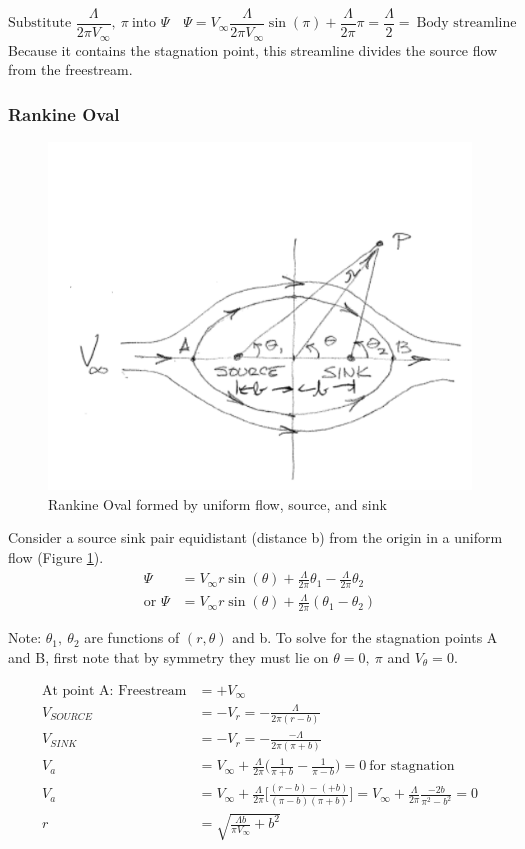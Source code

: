 \documentclass[draft=false, titlepage]{article}
\begin{document}
\begin{equation*}
\text{Substitute } \frac{\Lambda}{2\pi V_\infty},\ \pi\ \text{into } \Psi \quad
\Psi = V_\infty \frac{\Lambda}{2\pi V_\infty}\sin(\pi) + \frac{\Lambda}{2\pi}\pi = \frac{\Lambda}{2} =\ \text{Body streamline}
\end{equation*}
Because it contains the stagnation point, this streamline divides the source flow from the freestream.

\subsubsection{Rankine Oval}
\begin{figure}[ht]
    \centering
    \includegraphics[width=0.5\linewidth]{Figures/rankineOval.PNG}
    \caption{Rankine Oval formed by uniform flow, source, and sink}
    \label{fig:RankineOval}
\end{figure}
Consider a source sink pair equidistant (distance b) from the origin in a uniform flow (Figure \ref{fig:RankineOval}).
\begin{align*}
    \Psi &= V_\infty r\sin(\theta) + \frac{\Lambda}{2\pi}\theta_1 - \frac{\Lambda}{2\pi}\theta_2\\
    \text{or } \Psi &= V_\infty r\sin(\theta) + \frac{\Lambda}{2\pi} (\theta_1-\theta_2)
\end{align*}

Note: $\theta_1,\ \theta_2$ are functions of $(r, \theta)$ and b. To solve for the stagnation points A and B, first note that by symmetry they must lie on $\theta = 0,\ \pi$ and $V_\theta = 0$.

\begin{align*}
    \text{At point A: Freestream} &= +V_\infty \\
    V_{SOURCE} &= -V_r = -\frac{\Lambda}{2\pi(r-b)}\\
    V_{SINK} &= -V_r = -\frac{-\Lambda}{2\pi(\pi + b)}\\
    V_a &= V_\infty + \frac{\Lambda}{2\pi} \Big( \frac{1}{\pi + b} - \frac{1}{\pi - b}\Big) = 0\ \text{for stagnation} \\
    V_a &= V_\infty + \frac{\Lambda}{2\pi} \Big[ \frac{(r-b)-(+b)}{(\pi-b)(\pi+b)} \Big] = V_\infty + \frac{\Lambda}{2\pi} \frac{-2b}{\pi^2 - b^2} = 0\\
    r &= \sqrt{ \frac{\Lambda b}{\pi V_\infty} + b^2 }
\end{align*}
\end{document}
